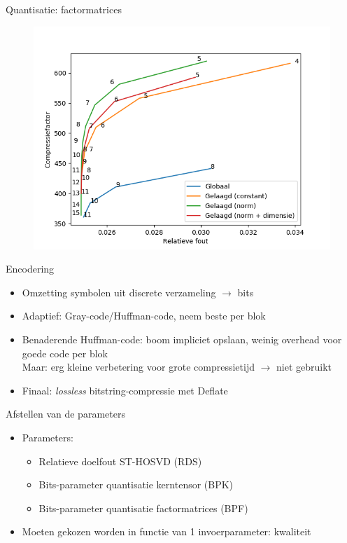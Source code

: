\documentclass[t,12pt,dutch
\ifx\beamermode\undefined\else,\beamermode\fi
]{beamer}
\begin{document}
\begin{frame}{Quantisatie: factormatrices}

\begin{figure}[H]
\centering
\includegraphics[scale=0.5]{images/factor_matrix_quantization_comparison.png}
\end{figure}

\end{frame}

\begin{frame}{Encodering}
\begin{itemize}
\item Omzetting symbolen uit discrete verzameling $\rightarrow$ bits
\item Adaptief: Gray-code/Huffman-code, neem beste per blok
\item Benaderende Huffman-code: boom impliciet opslaan, weinig overhead voor goede code per blok\\
Maar: erg kleine verbetering voor grote compressietijd $\rightarrow$ niet gebruikt
\item Finaal: \textit{lossless} bitstring-compressie met Deflate
\end{itemize}

\end{frame}

\begin{frame}{Afstellen van de parameters}

\begin{itemize}
\item Parameters:
\begin{itemize}
\item Relatieve doelfout ST-HOSVD (RDS)
\item Bits-parameter quantisatie kerntensor (BPK)
\item Bits-parameter quantisatie factormatrices (BPF)
\end{itemize}
\item Moeten gekozen worden in functie van 1 invoerparameter: kwaliteit
\end{itemize}

\end{frame}
\end{document}

